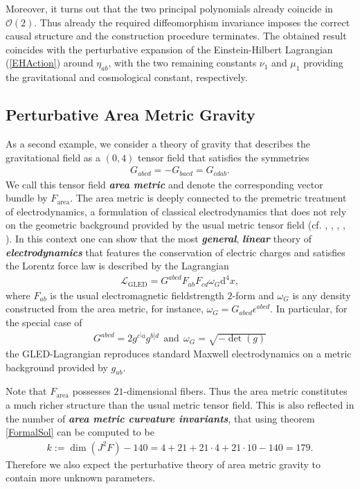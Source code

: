 \documentclass[%
preprint,
titlepage,
nofootinbib,
amsmath,amssymb,
showkeys,
aps,
prd,
floatfix,
]{revtex4-2}
\begin{document}
Moreover, it turns out that the two principal polynomials already coincide in $\mathcal{O}(2)$. 
Thus already the required diffeomorphism invariance imposes the correct causal structure and the construction procedure terminates. 
The obtained result coincides with the perturbative expansion of the Einstein-Hilbert Lagrangian (\ref{EHAction}) around $\eta_{ab}$, with the two remaining constants $\nu_1$ and $\mu_1$ providing the gravitational and cosmological constant, respectively.
\subsection{Perturbative Area Metric Gravity}
As a second example, we consider a theory of gravity that describes the gravitational field as a $(0,4)$ tensor field that satisfies the symmetries
\begin{align}\label{areaSym}
    G_{abcd} = -G_{bacd} = G_{cdab}.
\end{align}
We call this tensor field \textit{\textbf{area metric}} and denote the corresponding vector bundle by $F_{\text{area}}$. 
The area metric is deeply connected to the premetric treatment of electrodynamics, a formulation of classical electrodynamics that does not rely on the geometric background provided by the usual metric tensor field (cf. \cite{hehl2003foundations}, \cite{Hehl2005}, \cite{2004PhRvD..70j5022L}, \cite{1999PhLB..458..466O}, \cite{2009JPhA...42U5402I}).
In this context one can show that the most \textit{\textbf{general}}, \textit{\textbf{linear}} theory of \textit{\textbf{electrodynamics}} that features the conservation of electric charges and satisfies the Lorentz force law is described by the Lagrangian
\begin{align}
    \mathcal{L}_{\text{GLED}} =  G^{abcd}F_{ab}F_{cd}\omega_G\mathrm{d}^4x,
\end{align}
where $F_{ab}$ is the usual electromagnetic fieldstrength $2$-form and $\omega_G$ is any density constructed from the area metric, for instance, $\omega_G = G_{abcd}\epsilon^{abcd}$. 
In particular, for the special case of
\begin{align}
    G^{abcd} = 2 g^{c^[a}g^{b]d} \ \ \text{and} \ \  \omega_{G}=\sqrt{ -\operatorname{det}(g) }
\end{align}
the GLED-Lagrangian reproduces standard Maxwell electrodynamics on a metric background provided by $g_{ab}$.

Note that $F_{\text{area}}$ possesses $21$-dimensional fibers. Thus the area metric constitutes a much richer structure than the usual metric tensor field. This is also reflected in the number of \textit{\textbf{area metric curvature invariants}}, that using theorem \ref{FormalSol} can be computed to be
\begin{align}
    k:= \operatorname{dim}(J^2F) - 140 =
    4 + 21 + 21\cdot 4 + 21\cdot10 -140 = 179.
\end{align}
Therefore we also expect the perturbative theory of area metric gravity to contain more unknown parameters.
\end{document}
